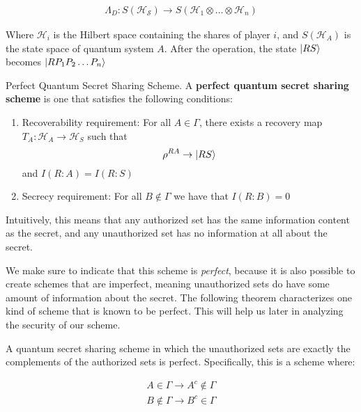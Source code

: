 \begin{align*}
    \Lambda_D: S(\mathcal{H_S}) \to S(\mathcal{H}_1 \otimes \dots \otimes \mathcal{H}_n)
\end{align*}

Where $\mathcal{H}_i$ is the Hilbert space containing the shares of player $i$, and $S(\mathcal{H}_A)$ is the state space of quantum system $A$. After the operation, the state $\ket{RS}$ becomes $\ket{RP_1P_2 \dots P_n}$

\begin{definition}{Perfect Quantum Secret Sharing Scheme.}
    \label{defn:perfect-qss}
    A \textbf{perfect quantum secret sharing scheme} is one that satisfies the following conditions:

    \begin{enumerate}
        \item Recoverability requirement: For all $A \in \Gamma$, there exists a recovery map $T_A: \mathcal{H}_A \to \mathcal{H}_S$ such that 
        \[\rho^{RA} \to \ket{RS}\]
        and $I(R:A) = I(R:S)$
        \item Secrecy requirement: For all $B \notin \Gamma$ we have that $I(R:B) = 0$
    \end{enumerate}

    Intuitively, this means that any authorized set has the same information content as the secret, and any unauthorized set has no information at all about the secret.
\end{definition}

We make sure to indicate that this scheme is \textit{perfect}, because it is also possible to create schemes that are imperfect, meaning unauthorized sets do have some amount of information about the secret. The following theorem characterizes one kind of scheme that is known to be perfect. This will help us later in analyzing the security of our scheme.

\begin{theorem}
    A quantum secret sharing scheme in which the unauthorized sets are exactly the complements of the authorized sets is perfect. Specifically, this is a scheme where:
    
    \begin{align*}
        A \in \Gamma \to A^c \notin \Gamma \\ 
        B \notin \Gamma \to B^c \in \Gamma \\ 
    \end{align*}
\end{theorem}



